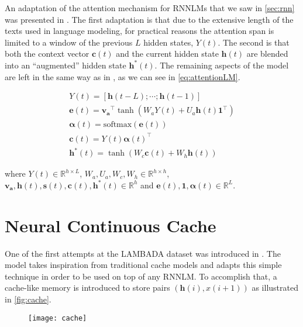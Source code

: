 An adaptation of the attention mechanism for RNNLMs that we saw in \ref{sec:rnn} was presented in \cite{daniluk2017frustratingly}. The first adaptation is that due to the extensive length of the texts used in language modeling, for practical reasons the attention span is limited to a window of the previous $L$ hidden states, $Y(t)$. The second is that both the context vector $\mathbf{c}(t)$ and the current hidden state $\mathbf{h}(t)$ are blended into an ``augmented'' hidden state $\mathbf{h^*}(t)$. The remaining aspects of the model are left in the same way as in \cite{bahdanau2014neural}, as we can see in \autoref{eq:attentionLM}.

\begin{equation} \label{eq:attentionLM}
	\begin{gathered}
		Y(t) = [\mathbf{h}(t-L) ; \cdots ; \mathbf{h}(t-1)] \\
		\mathbf{e}(t) = \mathbf{v_a}^{\top} \tanh(W_a Y(t) + U_a\mathbf{h}(t)\mathbf{1}^{\top}) \\
		\boldsymbol{\alpha}(t) = \text{softmax}(\mathbf{e}(t)) \\
		\mathbf{c}(t) = Y(t)\boldsymbol{\alpha}(t)^{\top} \\
		\mathbf{h^*}(t) = \tanh(W_c \mathbf{c}(t) + W_h \mathbf{h}(t))
	\end{gathered}	
\end{equation}

where $Y(t) \in \mathbb{R}^{h \times L}$, $W_a,U_a,W_c,W_h \in \mathbb{R}^{h \times h}$, $\mathbf{v_a},\mathbf{h}(t),\mathbf{s}(t),\mathbf{c}(t),\mathbf{h^*}(t) \in \mathbb{R}^{h}$ and $\mathbf{e}(t), \mathbf{1}, \boldsymbol{\alpha}(t) \in \mathbb{R}^{L}$.

\section{Neural Continuous Cache}
\label{sec:continuousCache}

One of the first attempts at the LAMBADA dataset was introduced in \cite{grave2016improving}. The model takes inspiration from traditional cache models \cite{kuhn1990cache} and adapts this simple technique in order to be used on top of any RNNLM. To accomplish that, a cache-like memory is introduced to store pairs $(\mathbf{h}(i),x(i+1))$ as illustrated in \autoref{fig:cache}.

\begin{figure}[H]
	\centering
	\texttt{[image: cache]}
	\label{fig:cache}
\end{figure}

